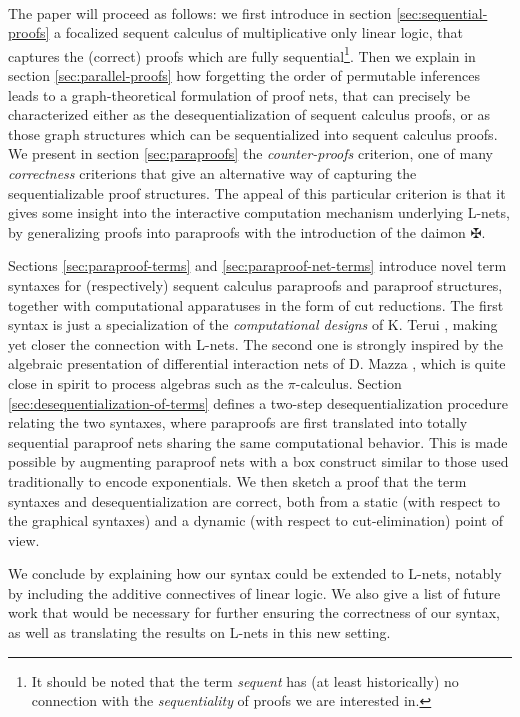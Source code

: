 \documentclass[12pt]{report}
\newcommand{\dai}{✠}
\begin{document}
~\\
The paper will proceed as follows: we first introduce in section \ref{sec:sequential-proofs} a
focalized sequent calculus of multiplicative only linear logic, that captures the (correct) proofs
which are fully sequential\footnote{It should be noted that the term \emph{sequent} has (at least
historically) no connection with the \emph{sequentiality} of proofs we are interested in.}. Then we
explain in section \ref{sec:parallel-proofs} how forgetting the order of permutable inferences leads
to a graph-theoretical formulation of proof nets, that can precisely be characterized either as the
desequentialization of sequent calculus proofs, or as those graph structures which can be
sequentialized into sequent calculus proofs. We present in section \ref{sec:paraproofs} the
\emph{counter-proofs} criterion, one of many \emph{correctness} criterions that give an alternative
way of capturing the sequentializable proof structures. The appeal of this particular criterion is
that it gives some insight into the interactive computation mechanism underlying L-nets, by
generalizing proofs into paraproofs with the introduction of the daimon $\dai$.

Sections \ref{sec:paraproof-terms} and \ref{sec:paraproof-net-terms} introduce novel term syntaxes
for (respectively) sequent calculus paraproofs and paraproof structures, together with computational
apparatuses in the form of cut reductions. The first syntax is just a specialization of the
\emph{computational designs} of K. Terui \cite{Ter11}, making yet closer the connection with L-nets.
The second one is strongly inspired by the algebraic presentation of differential interaction nets
of D. Mazza \cite{Maz16}, which is quite close in spirit to process algebras such as the
$π$-calculus. Section \ref{sec:desequentialization-of-terms} defines a two-step
desequentialization procedure relating the two syntaxes, where paraproofs are first translated into
totally sequential paraproof nets sharing the same computational behavior. This is made possible by
augmenting paraproof nets with a box construct similar to those used traditionally to encode
exponentials. We then sketch a proof that the term syntaxes and desequentialization are correct,
both from a static (with respect to the graphical syntaxes) and a dynamic (with respect to
cut-elimination) point of view.

We conclude by explaining how our syntax could be extended to L-nets, notably by including the
additive connectives of linear logic. We also give a list of future work that would be necessary for
further ensuring the correctness of our syntax, as well as translating the results on L-nets in this
new setting.
\end{document}

